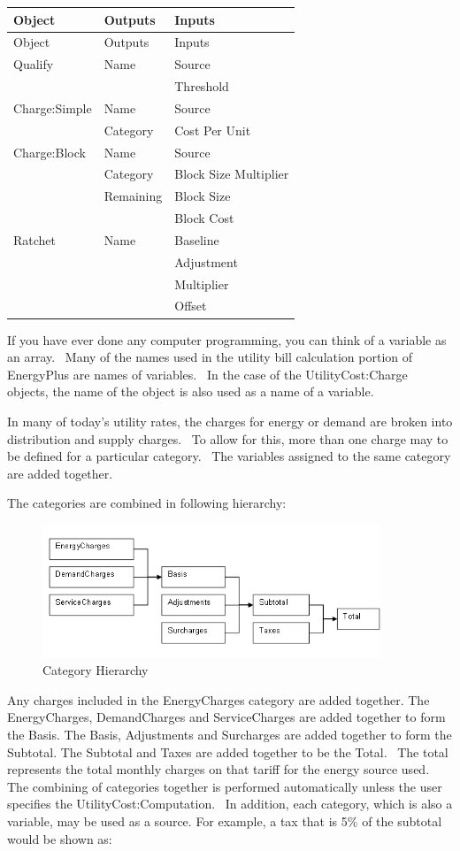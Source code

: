 \begin{longtable}[c]{@{}lll@{}}
\toprule 
Object & Outputs & Inputs \tabularnewline \midrule
\endfirsthead

\toprule 
Object & Outputs & Inputs \tabularnewline \midrule
\endhead

Qualify & Name & Source \tabularnewline
~ & ~ & Threshold \tabularnewline
Charge:Simple & Name & Source \tabularnewline
~ & Category & Cost Per Unit \tabularnewline
Charge:Block & Name & Source \tabularnewline
~ & Category & Block Size Multiplier \tabularnewline
~ & Remaining & Block Size \tabularnewline
~ & ~ & Block Cost \tabularnewline
Ratchet & Name & Baseline \tabularnewline
~ & ~ & Adjustment \tabularnewline
~ & ~ & Multiplier \tabularnewline
~ & ~ & Offset \tabularnewline
\bottomrule
\end{longtable}

If you have ever done any computer programming, you can think of a variable as an array.~ Many of the names used in the utility bill calculation portion of EnergyPlus are names of variables.~ In the case of the UtilityCost:Charge objects, the name of the object is also used as a name of a variable.

In many of today's utility rates, the charges for energy or demand are broken into distribution and supply charges.~ To allow for this, more than one charge may to be defined for a particular category.~ The variables assigned to the same category are added together.

The categories are combined in following hierarchy:


\begin{figure}[hbtp]
\centering
\includegraphics[width=0.9\textwidth, height=0.9\textheight, keepaspectratio=true]{media/image7909.png}
\caption{Category Hierarchy \label{fig:category-hierarchy}}
\end{figure}

Any charges included in the EnergyCharges category are added together. The EnergyCharges, DemandCharges and ServiceCharges are added together to form the Basis. The Basis, Adjustments and Surcharges are added together to form the Subtotal. The Subtotal and Taxes are added together to be the Total.~ The total represents the total monthly charges on that tariff for the energy source used.~ The combining of categories together is performed automatically unless the user specifies the UtilityCost:Computation.~ In addition, each category, which is also a variable, may be used as a source. For example, a tax that is 5\% of the subtotal would be shown as:

